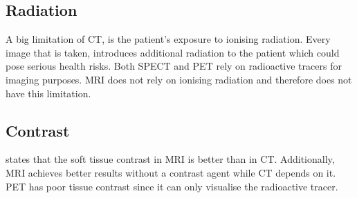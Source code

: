 \subsection*{Radiation}
A big limitation of \ac{CT}, is the patient's exposure to ionising radiation. Every image that is taken, introduces additional radiation to the patient which could pose serious health risks. Both \ac{SPECT} and \ac{PET} rely on radioactive tracers for imaging purposes. \ac{MRI} does not rely on ionising radiation and therefore does not have this limitation. 

\subsection*{Contrast}
\cite{khalil2011molecular} states that the soft tissue contrast in \ac{MRI} is better than in \ac{CT}. Additionally, \ac{MRI} achieves better results without a contrast agent while \ac{CT} depends on it. \ac{PET} has poor tissue contrast since it can only visualise the radioactive tracer.